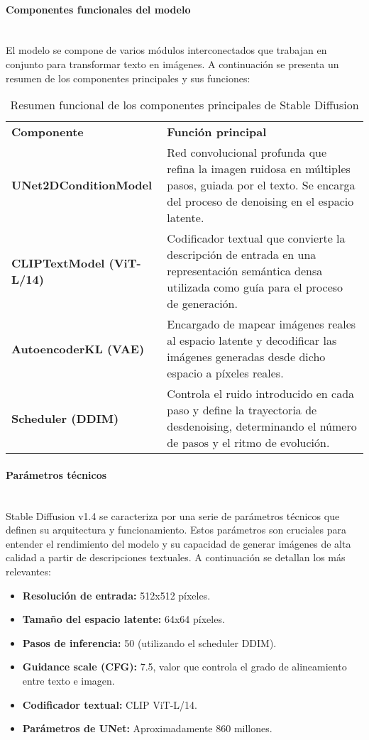 \paragraph{\textbf{Componentes funcionales del modelo}} \mbox{}\\[0.5em]
El modelo se compone de varios módulos interconectados que trabajan en conjunto para transformar texto en imágenes. A continuación se presenta un resumen de los componentes principales y sus funciones:
\begin{table}[H]
\centering
\renewcommand{\arraystretch}{1.5}
\begin{tabular}{p{4.5cm}p{11cm}}
\rowcolor{gray!30}
\textbf{Componente} & \textbf{Función principal} \\
\rowcolor{gray!10}
\textbf{UNet2DConditionModel} & Red convolucional profunda que refina la imagen ruidosa en múltiples pasos, guiada por el texto. Se encarga del proceso de denoising en el espacio latente. \\
\textbf{CLIPTextModel (ViT-L/14)} & Codificador textual que convierte la descripción de entrada en una representación semántica densa utilizada como guía para el proceso de generación. \\
\rowcolor{gray!10}
\textbf{AutoencoderKL (VAE)} & Encargado de mapear imágenes reales al espacio latente y decodificar las imágenes generadas desde dicho espacio a píxeles reales. \\
\textbf{Scheduler (DDIM)} & Controla el ruido introducido en cada paso y define la trayectoria de desdenoising, determinando el número de pasos y el ritmo de evolución. \\
\end{tabular}
\caption{Resumen funcional de los componentes principales de Stable Diffusion}
\label{tab:sd-components}
\end{table}

\paragraph{\textbf{Parámetros técnicos}} \mbox{}\\[0.5em]
Stable Diffusion v1.4 se caracteriza por una serie de parámetros técnicos que definen su arquitectura y funcionamiento. Estos parámetros son cruciales para entender el rendimiento del modelo y su capacidad de generar imágenes de alta calidad a partir de descripciones textuales. A continuación se detallan los más relevantes:
\begin{itemize}
\item \textbf{Resolución de entrada:} 512x512 píxeles.
\item \textbf{Tamaño del espacio latente:} 64x64 píxeles.
\item \textbf{Pasos de inferencia:} 50 (utilizando el scheduler DDIM).
\item \textbf{Guidance scale (CFG):} 7.5, valor que controla el grado de alineamiento entre texto e imagen.
\item \textbf{Codificador textual:} CLIP ViT-L/14.
\item \textbf{Parámetros de UNet:} Aproximadamente 860 millones.
\end{itemize}

